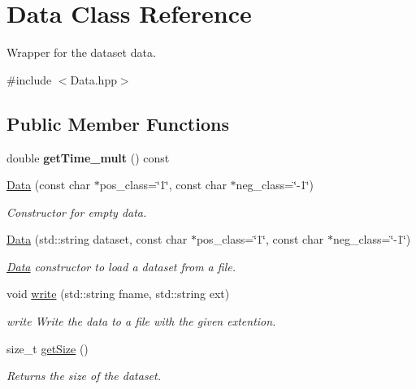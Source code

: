 \hypertarget{class_data}{}\section{Data Class Reference}
\label{class_data}


Wrapper for the dataset data.  




{\ttfamily \#include $<$Data.\+hpp$>$}

\subsection*{Public Member Functions}
\begin{DoxyCompactItemize}
\item 
\mbox{\label{class_data_a86900bc6198717fe98f5b041bc146295}} 
double {\bfseries get\+Time\+\_\+mult} () const
\item 
\hyperlink{class_data_aa3ca35c963eec5a4734df23f88443077}{Data} (const char $\ast$pos\+\_\+class=\char`\"{}1\char`\"{}, const char $\ast$neg\+\_\+class=\char`\"{}-\/1\char`\"{})
\begin{DoxyCompactList}\small\item\em Constructor for empty data. \end{DoxyCompactList}\item 
\hyperlink{class_data_a85afba1f115dce4b6d2a952326624dd4}{Data} (std\+::string dataset, const char $\ast$pos\+\_\+class=\char`\"{}1\char`\"{}, const char $\ast$neg\+\_\+class=\char`\"{}-\/1\char`\"{})
\begin{DoxyCompactList}\small\item\em \hyperlink{class_data}{Data} constructor to load a dataset from a file. \end{DoxyCompactList}\item 
void \hyperlink{class_data_a6550f72555320ae9225ba216a9f4e7b3}{write} (std\+::string fname, std\+::string ext)
\begin{DoxyCompactList}\small\item\em write Write the data to a file with the given extention. \end{DoxyCompactList}\item 
size\+\_\+t \hyperlink{class_data_a269f9d89ef47b9cf30454cd88c8ccf65}{get\+Size} ()
\begin{DoxyCompactList}\small\item\em Returns the size of the dataset. \end{DoxyCompactList}\item 

\end{DoxyCompactItemize}
